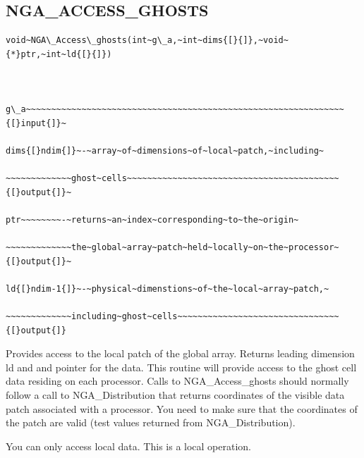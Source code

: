 \subsection*{\label{sub:NGA_ACCESS_GHOSTS}NGA\_ACCESS\_GHOSTS}
\begin{verbatim}
void~NGA\_Access\_ghosts(int~g\_a,~int~dims{[}{]},~void~{*}ptr,~int~ld{[}{]})



g\_a~~~~~~~~~~~~~~~~~~~~~~~~~~~~~~~~~~~~~~~~~~~~~~~~~~~~~~~~~~~~~~~{[}input{]}~

dims{[}ndim{]}~-~array~of~dimensions~of~local~patch,~including~

~~~~~~~~~~~~~ghost~cells~~~~~~~~~~~~~~~~~~~~~~~~~~~~~~~~~~~~~~~~~~{[}output{]}~

ptr~~~~~~~~-~returns~an~index~corresponding~to~the~origin~

~~~~~~~~~~~~~the~global~array~patch~held~locally~on~the~processor~{[}output{]}~

ld{[}ndim-1{]}~-~physical~dimenstions~of~the~local~array~patch,~

~~~~~~~~~~~~~including~ghost~cells~~~~~~~~~~~~~~~~~~~~~~~~~~~~~~~~{[}output{]}
\end{verbatim}
Provides access to the local patch of the global array. Returns leading
dimension ld and and pointer for the data. This routine will provide
access to the ghost cell data residing on each processor. Calls to
NGA\_Access\_ghosts should normally follow a call to NGA\_Distribution
that returns coordinates of the visible data patch associated with
a processor. You need to make sure that the coordinates of the patch
are valid (test values returned from NGA\_Distribution).

You can only access local data. This is a local operation. 


